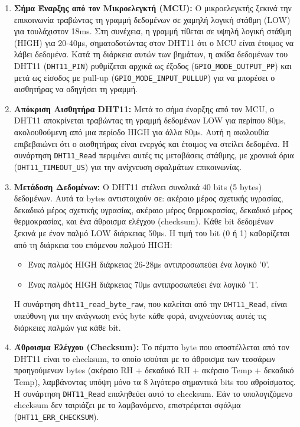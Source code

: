 \documentclass{article}
\begin{document}
\begin{enumerate}
    \item \textbf{Σήμα Έναρξης από τον Μικροελεγκτή (MCU):}
    Ο μικροελεγκτής ξεκινά την επικοινωνία τραβώντας τη γραμμή δεδομένων σε χαμηλή λογική στάθμη (LOW) για τουλάχιστον 18ms. Στη συνέχεια, η γραμμή τίθεται σε υψηλή λογική στάθμη (HIGH) για 20-40μs, σηματοδοτώντας στον DHT11 ότι ο MCU είναι έτοιμος να λάβει δεδομένα. Κατά τη διάρκεια αυτών των βημάτων, η ακίδα δεδομένων του DHT11 (\texttt{DHT11\_PIN}) ρυθμίζεται αρχικά ως έξοδος (\texttt{GPIO\_MODE\_OUTPUT\_PP}) και μετά ως είσοδος με pull-up (\texttt{GPIO\_MODE\_INPUT\_PULLUP}) για να μπορέσει ο αισθητήρας να οδηγήσει τη γραμμή.

    \item \textbf{Απόκριση Αισθητήρα DHT11:}
    Μετά το σήμα έναρξης από τον MCU, ο DHT11 αποκρίνεται τραβώντας τη γραμμή δεδομένων LOW για περίπου 80μs, ακολουθούμενη από μια περίοδο HIGH για άλλα 80μs. Αυτή η ακολουθία επιβεβαιώνει ότι ο αισθητήρας είναι ενεργός και έτοιμος να στείλει δεδομένα. Η συνάρτηση \texttt{DHT11\_Read} περιμένει αυτές τις μεταβάσεις στάθμης, με χρονικά όρια (\texttt{DHT11\_TIMEOUT\_US}) για την ανίχνευση σφαλμάτων επικοινωνίας.

    \item \textbf{Μετάδοση Δεδομένων:}
    Ο DHT11 στέλνει συνολικά 40 bits (5 bytes) δεδομένων. Αυτά τα bytes αντιστοιχούν σε: ακέραιο μέρος σχετικής υγρασίας, δεκαδικό μέρος σχετικής υγρασίας, ακέραιο μέρος θερμοκρασίας, δεκαδικό μέρος θερμοκρασίας, και ένα άθροισμα ελέγχου (checksum).
    Κάθε bit δεδομένων ξεκινά με έναν παλμό LOW διάρκειας 50μs. Η τιμή του bit (0 ή 1) καθορίζεται από τη διάρκεια του επόμενου παλμού HIGH:
    \begin{itemize}
        \item Ένας παλμός HIGH διάρκειας 26-28μs αντιπροσωπεύει ένα λογικό '0'.
        \item Ένας παλμός HIGH διάρκειας 70μs αντιπροσωπεύει ένα λογικό '1'.
    \end{itemize}
    Η συνάρτηση \texttt{dht11\_read\_byte\_raw}, που καλείται από την \texttt{DHT11\_Read}, είναι υπεύθυνη για την ανάγνωση ενός byte κάθε φορά, ανιχνεύοντας αυτές τις διάρκειες παλμών για κάθε bit.

    \item \textbf{Άθροισμα Ελέγχου (Checksum):}
    Το πέμπτο byte που αποστέλλεται από τον DHT11 είναι το checksum, το οποίο ισούται με το άθροισμα των τεσσάρων προηγούμενων bytes (ακέραιο RH + δεκαδικό RH + ακέραιο Temp + δεκαδικό Temp), λαμβάνοντας υπόψη μόνο τα 8 λιγότερο σημαντικά bits του αθροίσματος. Η συνάρτηση \texttt{DHT11\_Read} επαληθεύει αυτό το checksum. Εάν το υπολογιζόμενο checksum δεν ταιριάζει με το λαμβανόμενο, επιστρέφεται σφάλμα (\texttt{DHT11\_ERR\_CHECKSUM}).


\end{enumerate}
\end{document}
